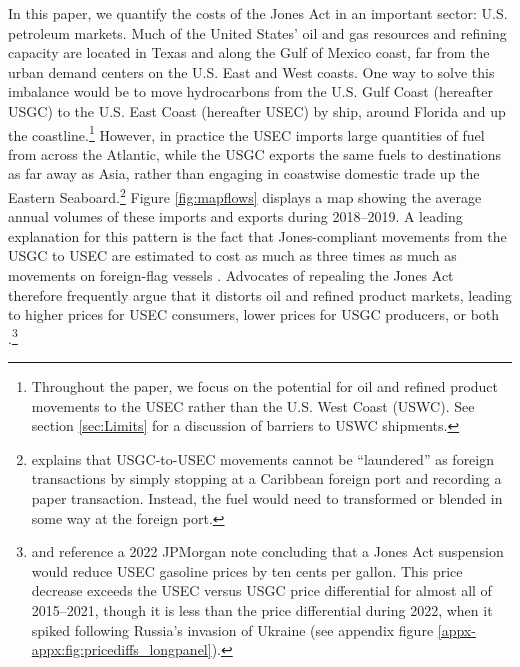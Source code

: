 \documentclass[12pt]{article}
\begin{document}
In this paper, we quantify the costs of the Jones Act in an important sector: U.S. petroleum markets. Much of the United States' oil and gas resources and refining capacity are located in Texas and along the Gulf of Mexico coast, far from the urban demand centers on the U.S. East and West coasts. One way to solve this imbalance would be to move hydrocarbons from the U.S. Gulf Coast (hereafter USGC) to the U.S. East Coast (hereafter USEC) by ship, around Florida and up the coastline.\footnote{Throughout the paper, we focus on the potential for oil and refined product movements to the USEC rather than the U.S. West Coast (USWC). See section \ref{sec:Limits} for a discussion of barriers to USWC shipments.} However, in practice the USEC imports large quantities of fuel from across the Atlantic, while the USGC exports the same fuels to destinations as far away as Asia, rather than engaging in coastwise domestic trade up the Eastern Seaboard.\footnote{\cite{CRS2019} explains that USGC-to-USEC movements cannot be ``laundered'' as foreign transactions by simply stopping at a Caribbean foreign port and recording a paper transaction. Instead, the fuel would need to transformed or blended in some way at the foreign port.\label{fn:launder}} Figure \ref{fig:mapflows} displays a map showing the average annual volumes of these imports and exports during 2018--2019. A leading explanation for this pattern is the fact that Jones-compliant movements from the USGC to USEC are estimated to cost as much as three times as much as movements on foreign-flag vessels \citep{CRS2017}. Advocates of repealing the Jones Act therefore frequently argue that it distorts oil and refined product markets, leading to higher prices for USEC consumers, lower prices for USGC producers, or both \citep{coleman2017,Cato2018,AEI2020,CatoJPMorgan2022,BbgJPMorgan2022}.\footnote{\cite{CatoJPMorgan2022} and \cite{BbgJPMorgan2022} reference a 2022 JPMorgan note concluding that a Jones Act suspension would reduce USEC gasoline prices by ten cents per gallon. This price decrease exceeds the USEC versus USGC price differential for almost all of 2015--2021, though it is less than the price differential during 2022, when it spiked following Russia's invasion of Ukraine (see appendix figure \ref{appx-appx:fig:pricediffs_longpanel}).} 
\end{document}
